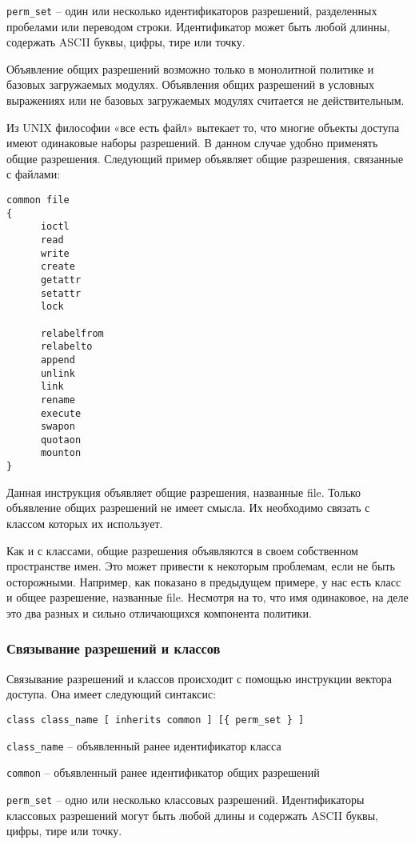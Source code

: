 \documentclass{./../class/UIR}
\begin{document}
    \verb"perm_set" – один или несколько идентификаторов разрешений, разделенных
    пробелами или переводом строки. Идентификатор может быть любой длинны, содержать ASCII
    буквы, цифры, тире или точку.

    Объявление общих разрешений возможно только в монолитной политике и базовых
    загружаемых модулях. Объявления общих разрешений в условных выражениях или не
    базовых загружаемых модулях считается не действительным.

    Из UNIX философии «все есть файл» вытекает то, что многие объекты доступа имеют
    одинаковые наборы разрешений. В данном случае удобно применять общие разрешения.
    Следующий пример объявляет общие разрешения, связанные с файлами:
\begin{verbatim}
common file
{
      ioctl
      read
      write
      create
      getattr
      setattr
      lock

      relabelfrom
      relabelto
      append
      unlink
      link
      rename
      execute
      swapon
      quotaon
      mounton
}
\end{verbatim}
    Данная инструкция объявляет общие разрешения, названные file. Только объявление
    общих разрешений не имеет смысла. Их необходимо связать с классом которых их
    использует.

    Как и с классами, общие разрешения объявляются в своем собственном пространстве
    имен. Это может привести к некоторым проблемам, если не быть осторожными.
    Например, как показано в предыдущем примере, у нас есть класс и общее
    разрешение, названные file. Несмотря на то, что имя одинаковое, на деле это два
    разных и сильно отличающихся компонента политики.

\subsubsection{Связывание разрешений и классов}
    Связывание разрешений и классов происходит с помощью инструкции вектора
    доступа. Она имеет следующий синтаксис:
	
\begin{verbatim}
class class_name [ inherits common ] [{ perm_set } ]
\end{verbatim}
	
	\verb"class_name" – объявленный ранее идентификатор класса
	
	\verb"common" – объявленный ранее идентификатор общих разрешений
	
	\verb"perm_set" – одно или несколько классовых разрешений. Идентификаторы
	классовых разрешений могут быть любой длины и содержать ASCII буквы, цифры,
	тире или точку.
\end{document}
